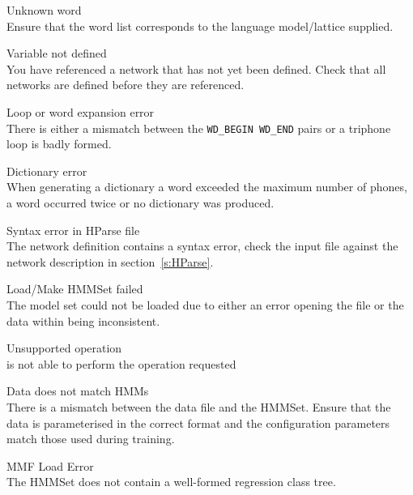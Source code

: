 \begin{itemize}
\begin{itemize}
 Unknown word\\
        Ensure that the word list corresponds to the language model/lattice
        supplied.

\end{itemize}


\begin{itemize}
 Variable not defined\\
        You have referenced a network that has not yet been defined.  Check 
        that all networks are defined before they are referenced.

 Loop or word expansion error\\
        There is either a mismatch between the \texttt{WD\_BEGIN WD\_END} 
        pairs or a triphone loop is badly formed.

 Dictionary error\\
        When generating a dictionary a word exceeded the maximum number of 
        phones, a word occurred twice or no dictionary was produced.

 Syntax error in HParse file\\
        The  network definition contains a syntax error, check 
        the input file against the network description in 
        section~\ref{s:HParse}.

\end{itemize}


\begin{itemize}

    Load/Make HMMSet failed\\
        The model set could not be loaded due to either an error opening the
        file or the data within being inconsistent.

 Unsupported operation\\
         is not able to perform the operation requested

 Data does not match HMMs\\
        There is a mismatch between the data file and the HMMSet.  Ensure that
        the data is parameterised in the correct format and the configuration
        parameters match those used during training.

 MMF Load Error\\
        The HMMSet does not contain a well-formed regression class tree.


\end{itemize}
\end{itemize}
